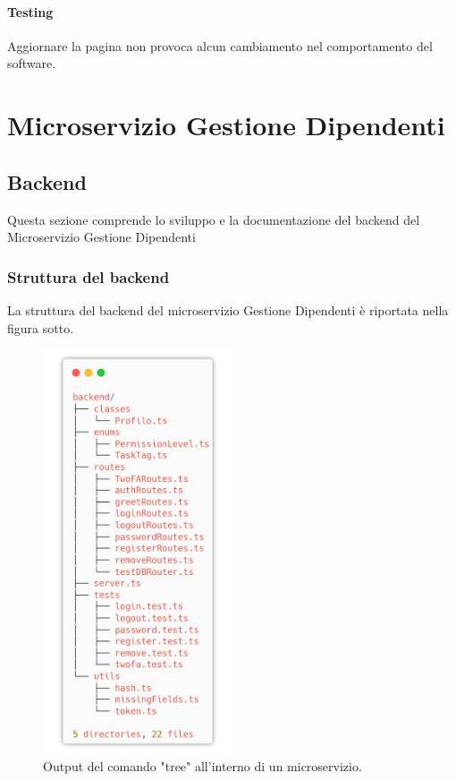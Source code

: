 \documentclass{report}
\begin{document}
\subsubsection*{Testing}
Aggiornare la pagina non provoca alcun cambiamento nel comportamento del software.




\chapter{Microservizio Gestione Dipendenti}
\section{Backend}

Questa sezione comprende lo sviluppo e la documentazione del backend del Microservizio Gestione Dipendenti

\subsection*{Struttura del backend}
La struttura del backend del microservizio Gestione Dipendenti è riportata
nella figura sotto.
\begin{figure}[H]
	\centering\includegraphics[width=0.5\textwidth]{images/microservizio-autenticazione/backend-structure.png}
	\caption{Output del comando "tree" all'interno di un microservizio.}
\end{figure}
\end{document}
